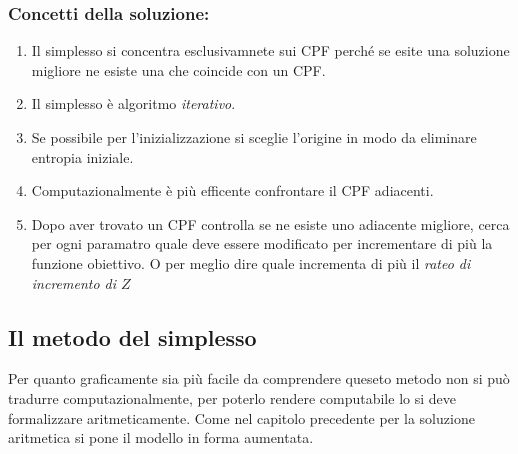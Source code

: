 \documentclass{article}
\begin{document}
        \subsubsection{Concetti della soluzione:}
        \begin{enumerate}
          \item Il simplesso si concentra esclusivamnete sui CPF perché se esite una soluzione migliore ne esiste una che coincide con un CPF.
          \item Il simplesso è algoritmo \textit{iterativo}.
          \usetikzlibrary {calc,positioning,shapes.misc}
            \item Se possibile per l'inizializzazione si sceglie l'origine in modo da eliminare entropia iniziale.
            \item Computazionalmente è più efficente confrontare il CPF adiacenti.
            \item Dopo aver trovato un CPF controlla se ne esiste uno adiacente migliore, cerca per ogni paramatro quale deve essere modificato per incrementare di più la funzione obiettivo. O per meglio dire quale incrementa di più il \textit{rateo di incremento di $Z$}

        \end{enumerate}
    \subsection{Il metodo del simplesso}
      Per quanto graficamente sia più facile da comprendere queseto metodo non si può tradurre computazionalmente, per poterlo rendere computabile lo si deve formalizzare aritmeticamente. Come nel capitolo precedente per la soluzione aritmetica si pone il modello in forma aumentata.
    
\end{document}
